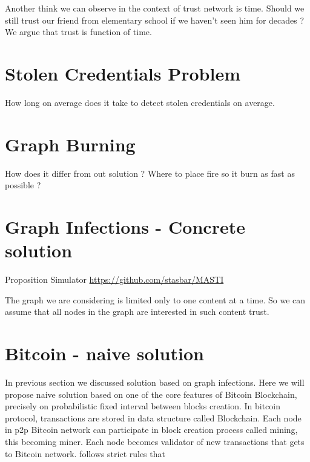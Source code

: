 \documentclass[nostrict]{szablonPG}
\begin{document}
Another think we can observe in the context of trust network is time. Should we still trust our friend from elementary school if we haven't seen him for decades ? We argue that trust is function of time.





\section{Stolen Credentials Problem}
How long on average does it take to detect stolen credentials on average.

\section{Graph Burning}
How does it differ from out solution ? Where to place fire so it burn as fast as possible ?


\section{Graph Infections - Concrete solution}
Proposition \cite{jekon2019content}
Simulator \url{https://github.com/stasbar/MASTI}

The graph we are considering is limited only to one content at a time. So we can assume that all nodes in the graph are interested in such content trust.

\section{Bitcoin - naive solution}
In previous section we discussed solution based on graph infections. Here we will propose naive solution based on one of the core features of Bitcoin Blockchain, precisely on probabilistic fixed interval between blocks creation. In bitcoin protocol, transactions are stored in data structure called Blockchain. Each node in p2p Bitcoin network can participate in block creation process called mining, this becoming miner. Each node becomes validator of new transactions that gets to Bitcoin network. follows strict rules that 
\end{document}
